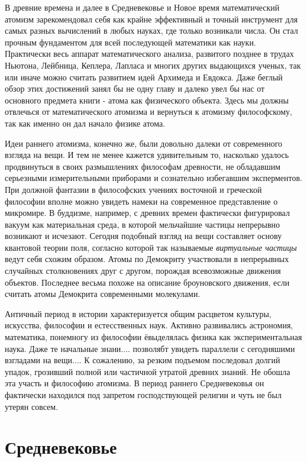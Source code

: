 В древние времена и далее в Средневековье и Новое время математический атомизм зарекомендовал себя как крайне эффективный и точный инструмент для самых разных вычислений в любых науках, где только возникали числа. 
Он стал прочным фундаментом для всей последующей математики как науки.
Практически весь аппарат математического анализа, развитого позднее в трудах Ньютона, Лейбница, Кеплера, Лапласа и многих других выдающихся ученых, так или иначе можно считать развитием идей Архимеда и Евдокса.
Даже беглый обзор этих достижений занял бы не одну главу и далеко увел бы нас от основного предмета книги - атома как физического объекта.
Здесь мы должны отвлечься от математического атомизма и вернуться к атомизму философскому, так как именно он дал начало физике атома.


Идеи раннего атомизма, конечно же, были довольно далеки от современного взгляда на вещи.
И тем не менее кажется удивительным то, насколько удалось продвинуться в своих размышлениях философам древности, не обладавшим серьезными измерительными приборами и сознательно избегавшим эксперментов.
При должной фантазии в философских учениях восточной и греческой философии вполне можно увидеть намеки на современное представление о микромире.
В буддизме, например, с древних времен фактически фигурировал вакуум как материальная среда, в которой мельчайшие частицы непрерывно возникают и исчезают. 
Сегодня подобный взгляд на вещи составляет основу квантовой теории поля, согласно которой так называемые \textit{виртуальные частицы} ведут себя схожим образом. 
Атомы по Демокриту участвовали в непрерывных случайных столкновениях друг с другом, порождая всевозможные движения объектов. 
Последнее весьма похоже на описание броуновского движения, если считать атомы Демокрита современными молекулами.

Античный период в истории характеризуется общим расцветом культуры, искусства, философии и естесственных наук.
Активно развивались астрономия, математика, понемногу из философии ёвыделялась физика как экспериментальная наука.
Даже те начальные знани....  позволябт увидеть параллели с сегодняшими взгладами на вещи....  
К сожалению, за резким подъемом последовал долгий упадок, грозивший полной или частичной утратой древних знаний.
Не обошла эта участь и философию атомизма.
В период раннего Средневековья он фактически находился под запретом господствующей религии и чуть не был утерян совсем.


\section*{Средневековье}

